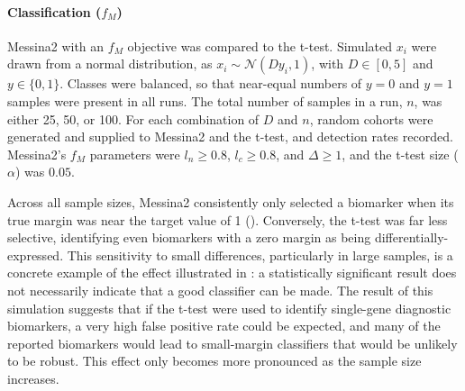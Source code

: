 \documentclass[dissertation.tex]{subfiles}
\begin{document}
\paragraph{Classification ($f_M$)}
Messina2 with an $f_M$ objective was compared to the t-test.  Simulated $x_i$ were drawn from a normal distribution, as $x_i \sim \mathcal{N}(D y_i, 1)$, with $D \in [0, 5]$ and $y \in \{0, 1\}$.  Classes were balanced, so that near-equal numbers of $y = 0$ and $y = 1$ samples were present in all runs.  The total number of samples in a run, $n$, was either 25, 50, or 100.  For each combination of $D$ and $n$,  random cohorts were generated and supplied to Messina2 and the t-test, and detection rates recorded.  Messina2's $f_M$ parameters were $l_n \geq 0.8$, $l_c \geq 0.8$, and $\Delta \geq 1$, and the t-test size ($\alpha$) was $0.05$.

Across all sample sizes, Messina2 consistently only selected a biomarker when its true margin was near the target value of 1 ().  Conversely, the t-test was far less selective, identifying even biomarkers with a zero margin as being differentially-expressed.  This sensitivity to small differences, particularly in large samples, is a concrete example of the effect illustrated in : a statistically significant result does not necessarily indicate that a good classifier can be made.  The result of this simulation suggests that if the t-test were used to identify single-gene diagnostic biomarkers, a very high false positive rate could be expected, and many of the reported biomarkers would lead to small-margin classifiers that would be unlikely to be robust.  This effect only becomes more pronounced as the sample size increases.
\end{document}
